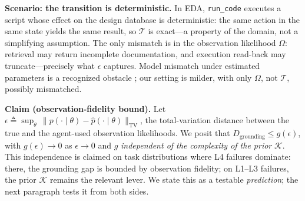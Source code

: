 \textbf{Scenario: the transition is deterministic.} In EDA, \texttt{run\_code} executes a script whose effect on the design database is deterministic: the same action in the same state yields the same result, so $\mathcal{T}$ is exact---a property of the domain, not a simplifying assumption. The only mismatch is in the observation likelihood $\Omega$: retrieval may return incomplete documentation, and execution read-back may truncate---precisely what $\epsilon$ captures. Model mismatch under estimated parameters is a recognized obstacle \cite{delage2010percentile}; our setting is milder, with only $\Omega$, not $\mathcal{T}$, possibly mismatched.

\textbf{Claim (observation-fidelity bound).} Let $\epsilon \triangleq \sup_{\theta}\, \| p(\cdot\mid\theta) - \hat{p}(\cdot\mid\theta) \|_{\mathrm{TV}}$, the total-variation distance between the true and the agent-used observation likelihoods. We posit that $D_{\text{grounding}} \le g(\epsilon)$, with $g(\epsilon)\to 0$ as $\epsilon\to 0$ and $g$ \emph{independent of the complexity of the prior} $\mathcal{K}$. This independence is claimed on task distributions where L4 failures dominate: there, the grounding gap is bounded by observation fidelity; on L1--L3 failures, the prior $\mathcal{K}$ remains the relevant lever. We state this as a testable \emph{prediction}; the next paragraph tests it from both sides.

